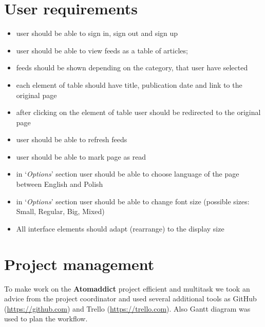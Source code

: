 \documentclass[12pt]{article}
\begin{document}
\section{User requirements}\label{user requirements}

\begin{itemize}

    \item user should be able to sign in, sign out and sign up

    \item user should be able to view feeds as a table of articles; 

    \item feeds should be shown depending on the category, that user have selected

    \item each element of table should have title, publication date and link to the original page

    \item after clicking on the element of table user should be redirected to the original page

    \item user should be able to refresh feeds

    \item user should be able to mark page as read

    \item in `\emph{Options}' section user should be able to choose language of the page between English and Polish

    \item in `\emph{Options}' section user should be able to change font size (possible sizes:  Small, Regular, Big, Mixed)

    \item All interface elements should adapt (rearrange) to the display size

\end{itemize}

\section{Project management}\label{project management}
To make work on the \textbf{Atomaddict} project efficient and multitask we took an advice from the project coordinator and used several additional tools as GitHub (\url{https://github.com}) and Trello (\url{https://trello.com}). Also Gantt diagram was used to plan the workflow.
\end{document}
